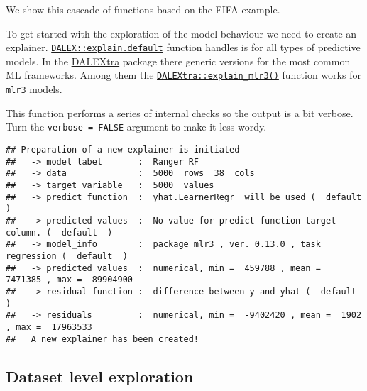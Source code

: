 \documentclass[
]{scrbook}
\newenvironment{Shaded}{\begin{snugshade}}{\end{snugshade}}
\newcommand{\AttributeTok}[1]{\textcolor[rgb]{0.77,0.63,0.00}{#1}}
\newcommand{\ConstantTok}[1]{\textcolor[rgb]{0.00,0.00,0.00}{#1}}
\newcommand{\FunctionTok}[1]{\textcolor[rgb]{0.00,0.00,0.00}{#1}}
\newcommand{\NormalTok}[1]{#1}
\newcommand{\OtherTok}[1]{\textcolor[rgb]{0.56,0.35,0.01}{#1}}
\newcommand{\SpecialCharTok}[1]{\textcolor[rgb]{0.00,0.00,0.00}{#1}}
\newcommand{\StringTok}[1]{\textcolor[rgb]{0.31,0.60,0.02}{#1}}
\renewenvironment{Shaded} {\begin{snugshade}\small} {\end{snugshade}}
\begin{document}
We show this cascade of functions based on the FIFA example.

To get started with the exploration of the model behaviour we need to create an explainer. \href{https://www.rdocumentation.org/packages/DALEX/topics/explain.default}{\texttt{DALEX::explain.default}} function handles is for all types of predictive models. In the \href{https://cran.r-project.org/package=DALEXtra}{DALEXtra} package there generic versions for the most common ML frameworks. Among them the \href{https://www.rdocumentation.org/packages/DALEXtra/topics/explain_mlr3}{\texttt{DALEXtra::explain\_mlr3()}} function works for \texttt{mlr3} models.

This function performs a series of internal checks so the output is a bit verbose. Turn the \texttt{verbose\ =\ FALSE} argument to make it less wordy.

\begin{Shaded}
\end{Shaded}

\begin{verbatim}
## Preparation of a new explainer is initiated
##   -> model label       :  Ranger RF 
##   -> data              :  5000  rows  38  cols 
##   -> target variable   :  5000  values 
##   -> predict function  :  yhat.LearnerRegr  will be used (  default  )
##   -> predicted values  :  No value for predict function target column. (  default  )
##   -> model_info        :  package mlr3 , ver. 0.13.0 , task regression (  default  ) 
##   -> predicted values  :  numerical, min =  459788 , mean =  7471385 , max =  89904900  
##   -> residual function :  difference between y and yhat (  default  )
##   -> residuals         :  numerical, min =  -9402420 , mean =  1902 , max =  17963533  
##   A new explainer has been created!
\end{verbatim}

\hypertarget{interpretability-dataset-level}{%
\subsection{Dataset level exploration}\label{interpretability-dataset-level}}
\end{document}
